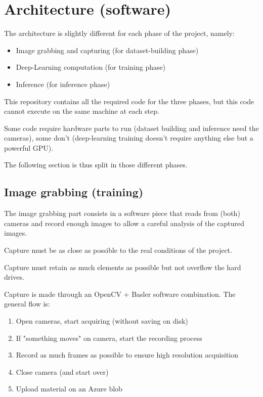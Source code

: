 \chapter{Architecture (software)}
\label{chapter:softarchitecture}

The architecture is slightly different for each phase of the project, namely:

\begin{itemize}
    \item Image grabbing and capturing (for dataset-building phase)
    \item Deep-Learning computation (for training phase)
    \item Inference (for inference phase)
\end{itemize}

This repository contains all the required code for the three phases, but this code cannot execute
on the same machine at each step.

Some code require hardware parts to run (dataset building and inference need the cameras), some don't
(deep-learning training doesn't require anything else but a powerful GPU).

The following section is thus split in those different phases.

\section{Image grabbing (training)}

The image grabbing part consists in a software piece that reads from (both) cameras and record enough images to
allow a careful analysis of the captured images.

Capture must be as close as possible to the real conditions of the project.

Capture must retain as much elements as possible but not overflow the hard drives.

Capture is made through an OpenCV + Basler software combination. The general flow is:

\begin{enumerate}
    \item Open cameras, start acquiring (without saving on disk)
    \item If "something moves" on camera, start the recording process
    \item Record as much frames as possible to ensure high resolution acquisition
    \item Close camera (and start over)
    \item Upload material on an Azure blob
\end{enumerate}


